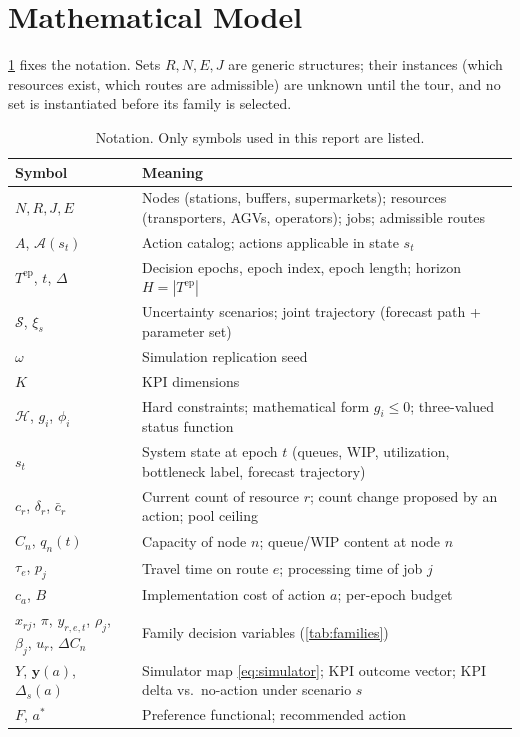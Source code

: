 \documentclass[11pt,a4paper]{article}
\newcommand{\Acal}{\mathcal{A}}
\newcommand{\Scal}{\mathcal{S}}
\newcommand{\Hcal}{\mathcal{H}}
\newcommand{\Tset}{T^{\mathrm{ep}}}
\begin{document}
\section{Mathematical Model}\label{sec:model}

\cref{tab:notation} fixes the notation. Sets $R, N, E, J$ are generic
structures; their instances (which resources exist, which routes are
admissible) are unknown until the tour, and no set is instantiated before its
family is selected.

\begin{table}[htbp]
\centering\small
\caption{Notation. Only symbols used in this report are listed.}
\label{tab:notation}
\begin{tabular}{@{}lp{12.5cm}@{}}
\toprule
Symbol & Meaning \\
\midrule
$N, R, J, E$ & Nodes (stations, buffers, supermarkets); resources
(transporters, AGVs, operators); jobs; admissible routes \\
$A$, $\Acal(s_t)$ & Action catalog; actions applicable in state $s_t$ \\
$\Tset$, $t$, $\Delta$ & Decision epochs, epoch index, epoch length; horizon
$H = |\Tset|$ \\
$\Scal$, $\xi_s$ & Uncertainty scenarios; joint trajectory (forecast path +
parameter set) \\
$\omega$ & Simulation replication seed \\
$K$ & KPI dimensions \\
$\Hcal$, $g_i$, $\phi_i$ & Hard constraints; mathematical form $g_i \le 0$;
three-valued status function \\
$s_t$ & System state at epoch $t$ (queues, WIP, utilization, bottleneck
label, forecast trajectory) \\
$c_r$, $\delta_r$, $\bar{c}_r$ & Current count of resource $r$; count change
proposed by an action; pool ceiling \\
$C_n$, $q_n(t)$ & Capacity of node $n$; queue/WIP content at node $n$ \\
$\tau_e$, $p_j$ & Travel time on route $e$; processing time of job $j$ \\
$c_a$, $B$ & Implementation cost of action $a$; per-epoch budget \\
$x_{rj}$, $\pi$, $y_{r,e,t}$, $\rho_j$, $\beta_j$, $u_r$, $\Delta C_n$ &
Family decision variables (\cref{tab:families}) \\
$Y$, $\mathbf{y}(a)$, $\Delta_s(a)$ & Simulator map \eqref{eq:simulator};
KPI outcome vector; KPI delta vs.\ no-action under scenario $s$ \\
$F$, $a^{*}$ & Preference functional; recommended action \\
\bottomrule
\end{tabular}
\end{table}
\end{document}
